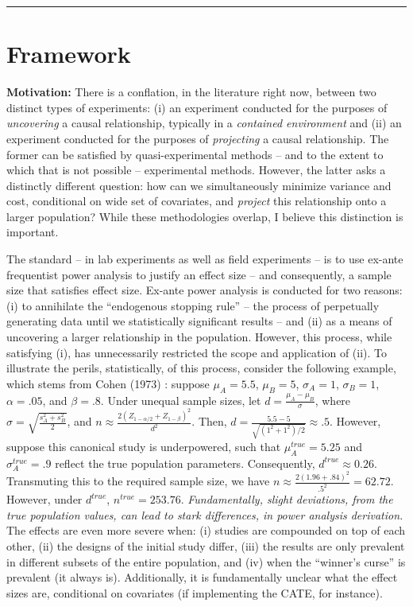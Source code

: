 \documentclass[12pt,letterpaper,doublespace, oneside]{article}
\begin{document}
\noindent\rule{\linewidth}{0.4pt}

\newpage
\section{Framework}
\noindent\textbf{Motivation:} There is a conflation, in the literature right now, between two distinct types of experiments: (i) an experiment conducted for the purposes of \emph{uncovering} a causal relationship, typically in a \emph{contained environment} and (ii) an experiment conducted for the purposes of \emph{projecting} a causal relationship. The former can be satisfied by quasi-experimental methods -- and to the extent to which that is not possible -- experimental methods. However, the latter asks a distinctly different question: how can we simultaneously minimize variance and cost, conditional on wide set of covariates, and \emph{project} this relationship onto a larger population? While these methodologies overlap, I believe this distinction is important. 

The standard -- in lab experiments as well as field experiments -- is to use ex-ante frequentist power analysis to justify an effect size -- and consequently, a sample size that satisfies effect size. Ex-ante power analysis is conducted for two reasons: (i) to annihilate the \enquote{endogenous stopping rule} -- the process of perpetually generating data until we statistically significant results -- and (ii) as a means of uncovering a larger relationship in the population. However, this process, while satisfying (i), has unnecessarily restricted the scope and application of (ii). To illustrate the perils, statistically, of this process, consider the following example, which stems from Cohen (1973) \cite{Cohen1973}: suppose $\mu_A = 5.5$, $\mu_B = 5$, $\sigma_A = 1$, $\sigma_B = 1$, $\alpha = .05$, and $\beta = .8$. Under unequal sample sizes, let $d = \frac{\mu_A-\mu_B}{\sigma}$, where $\sigma = \sqrt{\frac{s_A^2 + s_B^2}{2}}$, and $n \approx \frac{2(Z_{1-\alpha/2} + Z_{1-\beta})^2}{d^2}$. Then, $d= \frac{5.5-5}{\sqrt{(1^2+1^2)/2}} \approx .5$. However, suppose this canonical study is underpowered, such that $\mu_A^{true} = 5.25$ and $\sigma_A^{true} = .9$ reflect the true population parameters. Consequently, $d^{true} \approx 0.26$. Transmuting this to the required sample size, we have $n \approx \frac{2(1.96+.84)^2}{.5^2} = 62.72$. However, under $d^{true}$, $n^{true} = 253.76$. \emph{Fundamentally, slight deviations, from the true population values, can lead to stark differences, in power analysis derivation.} The effects are even more severe when: (i) studies are compounded on top of each other, (ii) the designs of the initial study differ, (iii) the results are only prevalent in different subsets of the entire population, and (iv) when the \enquote{winner's curse} is prevalent (it always is). Additionally, it is fundamentally unclear what the effect sizes are, conditional on covariates (if implementing the CATE, for instance).
\end{document}
